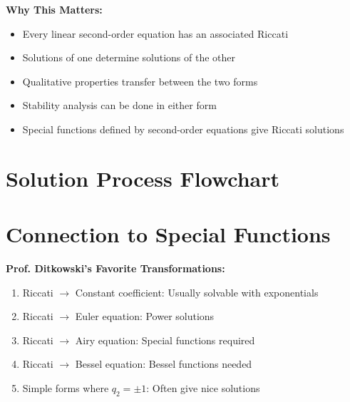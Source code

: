 \documentclass[12pt]{article}
\begin{document}
\begin{insight}
\textbf{Why This Matters:}
\begin{itemize}
    \item Every linear second-order equation has an associated Riccati
    \item Solutions of one determine solutions of the other
    \item Qualitative properties transfer between the two forms
    \item Stability analysis can be done in either form
    \item Special functions defined by second-order equations give Riccati solutions
\end{itemize}
\end{insight}

\section{Solution Process Flowchart}

\begin{center}
\end{center}

\section{Connection to Special Functions}

\begin{examtip}
\textbf{Prof. Ditkowski's Favorite Transformations:}
\begin{enumerate}
    \item Riccati $\to$ Constant coefficient: Usually solvable with exponentials
    \item Riccati $\to$ Euler equation: Power solutions
    \item Riccati $\to$ Airy equation: Special functions required
    \item Riccati $\to$ Bessel equation: Bessel functions needed
    \item Simple forms where $q_{2} = \pm 1$: Often give nice solutions
\end{enumerate}
\end{examtip}
\end{document}

